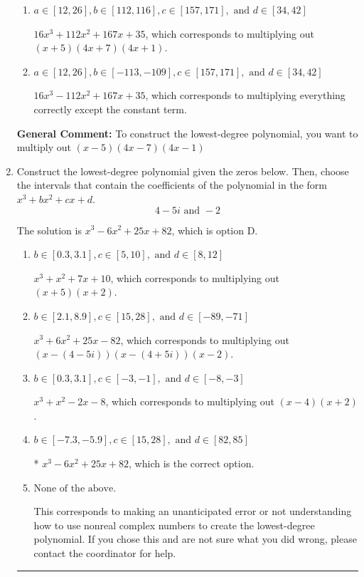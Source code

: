 \documentclass{extbook}[14pt]
\newcommand{\litem}[1]{\item #1

\rule{\textwidth}{0.4pt}}
\begin{document}
\begin{enumerate}
{\begin{enumerate}[label=\Alph*.]
$16x^{3} +48 x^{2} -153 x + 35$, which corresponds to multiplying out $(x + 5)(4x -7)(4x -1)$.
\item \( a \in [12, 26], b \in [112, 116], c \in [157, 171], \text{ and } d \in [34, 42] \)

$16x^{3} +112 x^{2} +167 x + 35$, which corresponds to multiplying out $(x + 5)(4x + 7)(4x + 1)$.
\item \( a \in [12, 26], b \in [-113, -109], c \in [157, 171], \text{ and } d \in [34, 42] \)

$16x^{3} -112 x^{2} +167 x + 35$, which corresponds to multiplying everything correctly except the constant term.
\end{enumerate}

\textbf{General Comment:} To construct the lowest-degree polynomial, you want to multiply out $(x -5)(4x -7)(4x -1)$
}
\litem{
Construct the lowest-degree polynomial given the zeros below. Then, choose the intervals that contain the coefficients of the polynomial in the form $x^3+bx^2+cx+d$.
\[ 4 - 5 i \text{ and } -2 \]

The solution is \( x^{3} -6 x^{2} +25 x + 82 \), which is option D.\begin{enumerate}[label=\Alph*.]
\item \( b \in [0.3, 3.1], c \in [5, 10], \text{ and } d \in [8, 12] \)

$x^{3} + x^{2} +7 x + 10$, which corresponds to multiplying out $(x + 5)(x + 2)$.
\item \( b \in [2.1, 8.9], c \in [15, 28], \text{ and } d \in [-89, -71] \)

$x^{3} +6 x^{2} +25 x -82$, which corresponds to multiplying out $(x-(4 - 5 i))(x-(4 + 5 i))(x -2)$.
\item \( b \in [0.3, 3.1], c \in [-3, -1], \text{ and } d \in [-8, -3] \)

$x^{3} + x^{2} -2 x -8$, which corresponds to multiplying out $(x -4)(x + 2)$.
\item \( b \in [-7.3, -5.9], c \in [15, 28], \text{ and } d \in [82, 85] \)

* $x^{3} -6 x^{2} +25 x + 82$, which is the correct option.
\item \( \text{None of the above.} \)

This corresponds to making an unanticipated error or not understanding how to use nonreal complex numbers to create the lowest-degree polynomial. If you chose this and are not sure what you did wrong, please contact the coordinator for help.
\end{enumerate}

}
\end{enumerate}
\end{document}

